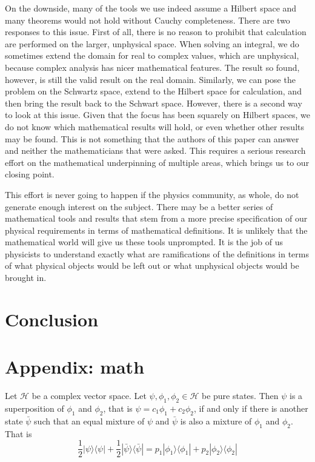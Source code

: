 \documentclass[10pt,twocolumn, nofootinbib]{revtex4-2}
\def\>{\rangle}
\def\<{\langle}
\begin{document}
On the downside, many of the tools we use indeed assume a Hilbert space and many theorems would not hold without Cauchy completeness. There are two responses to this issue. First of all, there is no reason to prohibit that calculation are performed on the larger, unphysical space. When solving an integral, we do sometimes extend the domain for real to complex values, which are unphysical, because complex analysis has nicer mathematical features. The result so found, however, is still the valid result on the real domain. Similarly, we can pose the problem on the Schwartz space, extend to the Hilbert space for calculation, and then bring the result back to the Schwart space. However, there is a second way to look at this issue. Given that the focus has been squarely on Hilbert spaces, we do not know which mathematical results will hold, or even whether other results may be found. This is not something that the authors of this paper can answer and neither the mathematicians that were asked. This requires a serious research effort on the mathematical underpinning of multiple areas, which brings us to our closing point.

This effort is never going to happen if the physics community, as whole, do not generate enough interest on the subject. There may be a better series of mathematical tools and results that stem from a more precise specification of our physical requirements in terms of mathematical definitions. It is unlikely that the mathematical world will give us these tools unprompted. It is the job of us physicists to understand exactly what are ramifications of the definitions in terms of what physical objects would be left out or what unphysical objects would be brought in.

\section{Conclusion}




\section*{Appendix: math}

Let $\mathcal{H}$ be a complex vector space. Let $\psi, \phi_1, \phi_2 \in \mathcal{H}$ be pure states. Then $\psi$ is a superposition of $\phi_1$ and $\phi_2$, that is $\psi = c_1 \phi_1 + c_2 \phi_2$, if and only if there is another state $\bar{\psi}$ such that an equal mixture of $\psi$ and $\bar{\psi}$ is also a mixture of $\phi_1$ and $\phi_2$. That is
\begin{equation}
	\frac{1}{2}|\psi\>\<\psi| + \frac{1}{2}|\bar{\psi}\>\<\bar{\psi}| = p_1|\phi_1\>\<\phi_1| + p_2|\phi_2\>\<\phi_2|
\end{equation}
\end{document}
